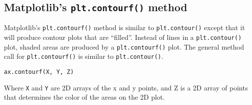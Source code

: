 \documentclass{book}
\newcommand{\passthrough}[1]{#1}
\begin{document}
    \begin{center}
    \end{center}
    { \hspace*{\fill} \\}
    

    
        \hypertarget{matplotlibs-plt.contourf-method}{%
\subsection{\texorpdfstring{Matplotlib's \texttt{plt.contourf()}
method}{Matplotlib's plt.contourf() method}}\label{matplotlibs-plt.contourf-method}}
    




    
        Matplotlib's \passthrough{\lstinline!plt.contourf()!} method is similar
to \passthrough{\lstinline!plt.contour()!} except that it will produce
contour plots that are ``filled''. Instead of lines in a
\passthrough{\lstinline!plt.contour()!} plot, shaded areas are produced
by a \passthrough{\lstinline!plt.contourf()!} plot. The general method
call for \passthrough{\lstinline!plt.contourf()!} is similar to
\passthrough{\lstinline!plt.contour()!}.

\begin{lstlisting}
ax.contourf(X, Y, Z)
\end{lstlisting}

Where \passthrough{\lstinline!X!} and \passthrough{\lstinline!Y!} are 2D
arrays of the x and y points, and Z is a 2D array of points that
determines the color of the areas on the 2D plot.
    
\end{document}
